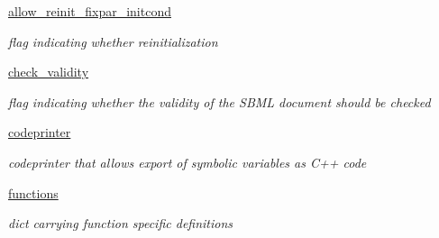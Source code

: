 \begin{DoxyCompactItemize}
\item 
\mbox{\label{classamici_1_1sbml__import_1_1_sbml_importer_a50ba58e6df269149d17dda632a15620a}} 
\mbox{\hyperlink{classamici_1_1sbml__import_1_1_sbml_importer_a50ba58e6df269149d17dda632a15620a}{allow\+\_\+reinit\+\_\+fixpar\+\_\+initcond}}
\begin{DoxyCompactList}\small\item\em flag indicating whether reinitialization \end{DoxyCompactList}\item 
\mbox{\label{classamici_1_1sbml__import_1_1_sbml_importer_a0081a154645011de07914e7be47eba32}} 
\mbox{\hyperlink{classamici_1_1sbml__import_1_1_sbml_importer_a0081a154645011de07914e7be47eba32}{check\+\_\+validity}}
\begin{DoxyCompactList}\small\item\em flag indicating whether the validity of the S\+B\+ML document should be checked \end{DoxyCompactList}\item 
\mbox{\label{classamici_1_1sbml__import_1_1_sbml_importer_a06a85475199493f1076eeaae2f9292fb}} 
\mbox{\hyperlink{classamici_1_1sbml__import_1_1_sbml_importer_a06a85475199493f1076eeaae2f9292fb}{codeprinter}}
\begin{DoxyCompactList}\small\item\em codeprinter that allows export of symbolic variables as C++ code \end{DoxyCompactList}\item 
\mbox{\label{classamici_1_1sbml__import_1_1_sbml_importer_a2cb6c540c07a402759bab624703ecdb2}} 
\mbox{\hyperlink{classamici_1_1sbml__import_1_1_sbml_importer_a2cb6c540c07a402759bab624703ecdb2}{functions}}
\begin{DoxyCompactList}\small\item\em dict carrying function specific definitions \end{DoxyCompactList}\item 
\mbox{\label{classamici_1_1sbml__import_1_1_sbml_importer_a591fb19f856c8faff2c302734ad80cc0}} 

\end{DoxyCompactItemize}

